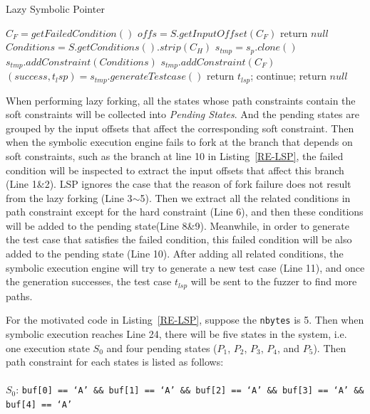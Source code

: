\begin{algorithm}
  \caption{Lazy Symbolic Pointer}
  \label{LSP}
  $C_F = getFailedCondition()$\;
  $offs = S.getInputOffset(C_F)$\;
  {
    return $null$\;
  }
  $Conditions = S.getConditions().strip(C_H)$\;
  {
    $s_{tmp} = s_p.clone()$\;
    $s_{tmp}.addConstraint(Conditions)$\;
    $s_{tmp}.addConstraint(C_F)$\;
    $(success, t_lsp) = s_{tmp}.generateTestcase()$\;
    {
      return $t_{lsp}$;
    } {
      continue;
    }
  }
  return $null$\;
\end{algorithm}
  
When performing lazy forking, all the states whose path constraints contain the soft constraints will be collected into \emph{Pending States}. And the pending states are grouped by the input offsets that affect the corresponding soft constraint. %
Then when the symbolic execution engine fails to fork at the branch that depends on soft constraints, such as the branch at line 10 in Listing~\ref{RE-LSP}, the failed condition will be inspected to extract the input offsets that affect this branch (Line 1\&2). LSP ignores the case that the reason of fork failure does not result from the lazy forking (Line 3$\sim$5). Then we extract all the related conditions in path constraint except for the hard constraint (Line 6), and then these conditions will be added to the pending state(Line 8\&9). Meanwhile, in order to generate the test case that satisfies the failed condition, this failed condition will be also added to the pending state (Line 10). After adding all related conditions, the symbolic execution engine will try to generate a new test case (Line 11), and once the generation successes, the test case $t_{lsp}$ will be sent to the fuzzer to find more paths.

For the motivated code in Listing~\ref{RE-LSP}, suppose the \texttt{nbytes} is 5. Then when symbolic execution reaches Line 24, there will be five states in the system, i.e. one execution state $S_0$ and four pending states ($P_1$, $P_2$, $P_3$, $P_4$, and $P_5$). 
Then path constraint for each states is listed as follows:
\\
\\
\indent$S_0$: \texttt{buf[0] == `A' \&\& buf[1] == `A' \&\& buf[2] == `A' \&\& buf[3] == `A' \&\& buf[4] == `A'}


